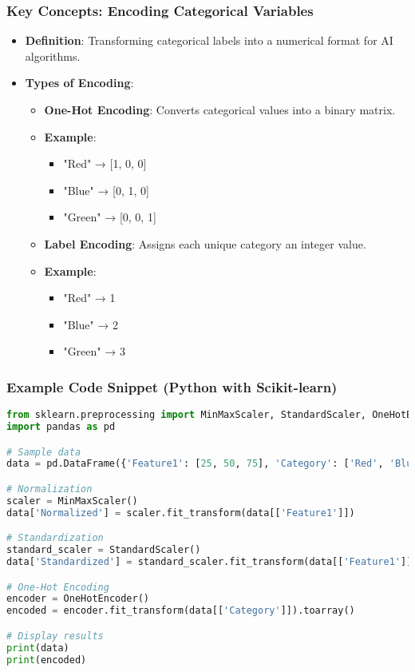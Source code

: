 \documentclass[aspectratio=169]{beamer}
\begin{document}
\begin{frame}
    \frametitle{Key Concepts: Encoding Categorical Variables}
    \begin{itemize}
        \item \textbf{Definition}: Transforming categorical labels into a numerical format for AI algorithms.
        \item \textbf{Types of Encoding}:
            \begin{itemize}
                \item \textbf{One-Hot Encoding}: Converts categorical values into a binary matrix.
                \item \textbf{Example}:
                \begin{itemize}
                    \item "Red" → [1, 0, 0]
                    \item "Blue" → [0, 1, 0]
                    \item "Green" → [0, 0, 1]
                \end{itemize}
                \item \textbf{Label Encoding}: Assigns each unique category an integer value.
                \item \textbf{Example}:
                \begin{itemize}
                    \item "Red" → 1
                    \item "Blue" → 2
                    \item "Green" → 3
                \end{itemize}
            \end{itemize}
    \end{itemize}
\end{frame}

\begin{frame}[fragile]
    \frametitle{Example Code Snippet (Python with Scikit-learn)}
    \begin{lstlisting}[language=Python]
from sklearn.preprocessing import MinMaxScaler, StandardScaler, OneHotEncoder
import pandas as pd

# Sample data
data = pd.DataFrame({'Feature1': [25, 50, 75], 'Category': ['Red', 'Blue', 'Green']})

# Normalization
scaler = MinMaxScaler()
data['Normalized'] = scaler.fit_transform(data[['Feature1']])

# Standardization
standard_scaler = StandardScaler()
data['Standardized'] = standard_scaler.fit_transform(data[['Feature1']])

# One-Hot Encoding
encoder = OneHotEncoder()
encoded = encoder.fit_transform(data[['Category']]).toarray()

# Display results
print(data)
print(encoded)
    \end{lstlisting}
\end{frame}
\end{document}
